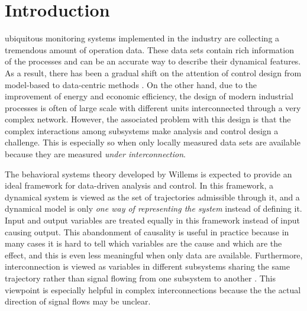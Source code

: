 \documentclass[11pt,print,draftcls,onecolumn,romanappendices]{ieeecolor}
\newcommand{\revise}[1]{{\color{black} #1}}
\begin{document}
\section{Introduction}
 ubiquitous monitoring systems implemented in the industry are collecting \revise{a} tremendous amount of operation data. These data sets contain rich information of the processes and can be an accurate way to describe their dynamical features. As a result, there has been a gradual shift on the attention of control design from model-based to data-centric methods \cite{Stanley:2018,Wang:2019b}. On the other hand, due to the improvement of energy and economic efficiency, the design of modern industrial processes is often of large scale with different units interconnected through a very complex network. However, the associated problem with this design is that the complex interactions among subsystems make analysis and control design a challenge. This is especially so when only locally measured data sets are available because they are measured \emph{under interconnection}.

The behavioral systems theory developed by Willems \cite{Willems:1991} is expected to provide an ideal framework for data-driven analysis and control. In this framework, a dynamical system is viewed as the set of trajectories admissible through it, and a dynamical model is only \emph{one way of representing the system} instead of defining it. Input and output variables are treated equally in this framework instead of input causing output. This abandonment of causality is useful in practice because in many cases it is hard to tell which variables are the cause and which are the effect, and this is even less meaningful when only data are available. Furthermore, interconnection is viewed as variables in different subsystems sharing the same trajectory rather than signal flowing from one subsystem to another \cite{Willems:1997}. This viewpoint is especially helpful in complex interconnections because the the actual direction of signal flows may be unclear. 
\end{document}
